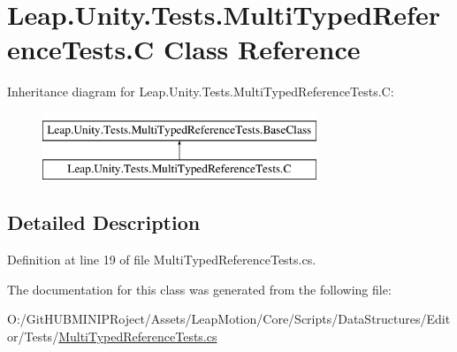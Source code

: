 \hypertarget{class_leap_1_1_unity_1_1_tests_1_1_multi_typed_reference_tests_1_1_c}{}\section{Leap.\+Unity.\+Tests.\+Multi\+Typed\+Reference\+Tests.\+C Class Reference}
\label{class_leap_1_1_unity_1_1_tests_1_1_multi_typed_reference_tests_1_1_c}
Inheritance diagram for Leap.\+Unity.\+Tests.\+Multi\+Typed\+Reference\+Tests.\+C\+:\begin{figure}[H]
\begin{center}
\leavevmode
\includegraphics[height=2.000000cm]{class_leap_1_1_unity_1_1_tests_1_1_multi_typed_reference_tests_1_1_c}
\end{center}
\end{figure}


\subsection{Detailed Description}


Definition at line 19 of file Multi\+Typed\+Reference\+Tests.\+cs.



The documentation for this class was generated from the following file\+:\begin{DoxyCompactItemize}
\item 
O\+:/\+Git\+H\+U\+B\+M\+I\+N\+I\+P\+Roject/\+Assets/\+Leap\+Motion/\+Core/\+Scripts/\+Data\+Structures/\+Editor/\+Tests/\mbox{\hyperlink{_multi_typed_reference_tests_8cs}{Multi\+Typed\+Reference\+Tests.\+cs}}\end{DoxyCompactItemize}
